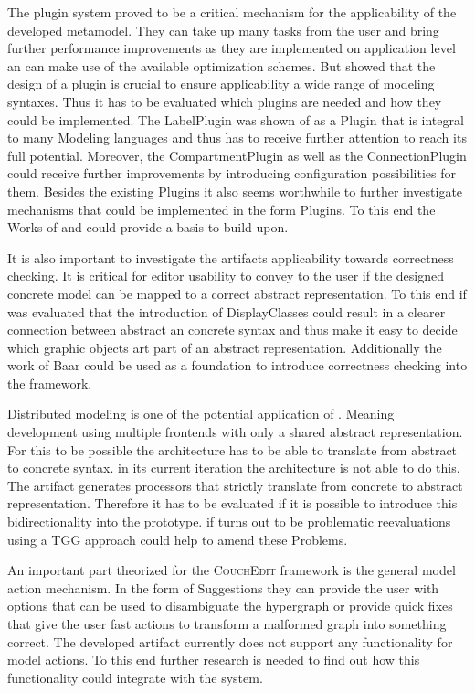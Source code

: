 The plugin system proved to be a critical mechanism for the applicability of the developed metamodel. They can take up many tasks from the user and bring further performance improvements as they are implemented on application level an can make use of the available optimization schemes. But  showed that the design of a plugin is crucial to ensure applicability a wide range of modeling syntaxes. Thus it has to be evaluated which plugins are needed and how they could be implemented. The LabelPlugin was shown of as a Plugin that is integral to many Modeling languages and thus has to receive further attention to reach its full potential. Moreover, the CompartmentPlugin as well as the ConnectionPlugin could receive further improvements by introducing configuration possibilities for them. Besides the existing Plugins it also seems worthwhile to further investigate mechanisms that could be implemented in the form Plugins. To this end the Works of \cite{van_tendeloo_concrete_2017} and \cite{costagliola_classification_2002} could provide a basis to build upon. 

It is also important to investigate the artifacts applicability towards correctness checking. It is critical for editor usability to convey to the user if the designed concrete model can be mapped to a correct abstract representation. To this end if was evaluated that the introduction of DisplayClasses could result in a clearer connection between abstract an concrete syntax and thus make it easy to decide which graphic objects art part of an abstract representation. Additionally the work of Baar \cite{baar_correctly_2008} could be used as a foundation to introduce correctness checking into the framework.

Distributed modeling is one of the potential application of . Meaning development using multiple frontends with only a shared abstract representation. For this to be possible the architecture has to be able to translate from abstract to concrete syntax. in its current iteration the architecture is not able to do this. The artifact generates processors that strictly translate from concrete to abstract representation. Therefore it has to be evaluated if it is possible to introduce this bidirectionality into the prototype. if turns out to be problematic reevaluations using a TGG approach could help to amend these Problems. 


An important part theorized for the \textsc{CouchEdit} framework is the general model action mechanism. In the form of Suggestions they can provide the user with options that can be used to disambiguate the hypergraph or provide quick fixes that give the user fast actions to transform a malformed graph into something correct. The developed artifact currently does not support any functionality for model actions. To this end further research is needed to find out how this functionality could integrate with the system.

